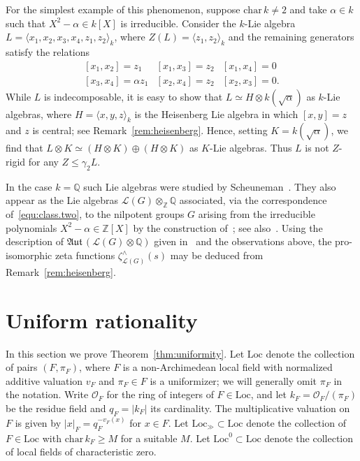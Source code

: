 \documentclass[11pt,a4paper]{amsart}
\theoremstyle{plain}
\theoremstyle{remark}
\newcommand{\Z}{\mathbb{Z}}
\newcommand{\Q}{\mathbb{Q}}
\newcommand{\tensor}{\otimes}
\def \aAut {\mathfrak{Aut} \,}
\begin{document}
For the simplest example of this phenomenon, suppose $\mathrm{char} \, k \neq 2$ and take $\alpha \in k$ such that $X^2 - \alpha \in k[X]$ is irreducible.  Consider the $k$-Lie algebra $L = \langle x_1, x_2, x_3, x_4, z_1, z_2 \rangle_k$, where $Z(L) = \langle z_1, z_2 \rangle_k$ and the remaining generators satisfy the relations
$$
\begin{array}{lcl}
[x_1, x_2] = z_1 & {[x_1, x_3] = z_2} & {[x_1, x_4] = 0} \\
{[x_3, x_4] = \alpha z_1} & [x_2, x_4] = z_2 & [x_2, x_3] = 0.
\end{array}
$$
While $L$ is indecomposable, it is easy to show that $L \simeq H \tensor k(\sqrt{\alpha})$ as $k$-Lie algebras, where $H = \langle x, y, z \rangle_k$ is the Heisenberg Lie algebra in which $[x,y] = z$ and $z$ is central; see Remark~\ref{rem:heisenberg}.  Hence, setting $K = k(\sqrt{\alpha})$, we find that $L \tensor K \simeq (H \tensor K) \oplus (H \tensor K)$ as $K$-Lie algebras.  Thus $L$ is not $Z$-rigid for any $Z \leq \gamma_2 L$.

In the case $k = \Q$ such Lie algebras were studied by Scheuneman~\cite[Proposition~1]{Scheuneman/67}.  They also appear as the Lie algebras $\mathcal{L}(G) \tensor_\Z \Q$ associated, via the correspondence of~\eqref{equ:class.two}, to the nilpotent groups $G$ arising from the irreducible polynomials $X^2 - \alpha \in \Z[X]$ by the construction of~\cite[Theorem~6.3]{GSegal/84}; see also~\cite{BKO/even}.  Using the description of $\aAut (\mathcal{L}(G) \tensor \Q)$ given in~\cite[Theorem~1.4]{BKO/even} and the observations above, the pro-isomorphic zeta functions $\zeta^\wedge_{\mathcal{L}(G)}(s)$ may be deduced from Remark~\ref{rem:heisenberg}.  



\section{Uniform rationality} \label{sec:appendix}
In this section we prove Theorem~\ref{thm:uniformity}.  
Let $\mathrm{Loc}$ denote the collection of pairs $(F,\pi_F)$, where $F$ is a non-Archimedean local field with normalized additive valuation $v_F$ and $\pi_F \in F$ is a uniformizer; we will generally omit $\pi_F$ in the notation.  Write $\mathcal{O}_F$ for the ring of integers of $F \in \mathrm{Loc}$, and let $k_F = \mathcal{O}_F / (\pi_F)$ be the residue field and $q_F = |k_F|$ its cardinality.  The multiplicative valuation on $F$ is given by $| x |_F = q_F^{-v_F(x)}$ for $x \in F$.  Let $\mathrm{Loc}_{\gg} \subset \mathrm{Loc}$ denote the collection of $F \in \mathrm{Loc}$ with $\mathrm{char} \, k_F \geq M$ for a suitable $M$.  Let $\mathrm{Loc}^0 \subset \mathrm{Loc}$ denote the collection of local fields of characteristic zero.  
\end{document}
